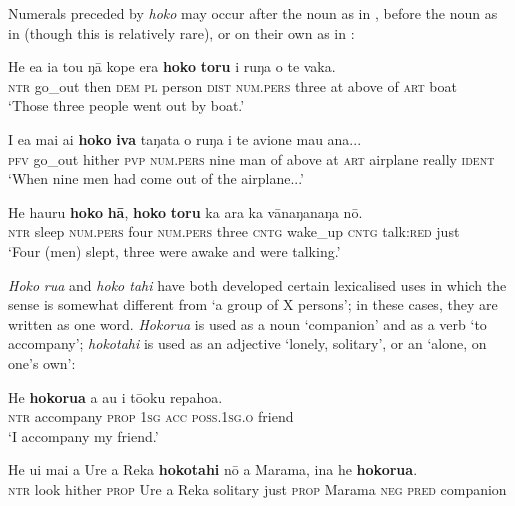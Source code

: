 Numerals preceded by \textit{hoko} may occur after the noun as in , before the noun as in  (though this is relatively rare), or on their own as in :

\ea\label{ex:4.30}
\gll He e{\ꞌ}a ia tou ŋā kope era \textbf{hoko} \textbf{toru} {\ꞌ}i ruŋa o te vaka. \\
\textsc{ntr} go\_out then \textsc{dem} \textsc{pl} person \textsc{dist} \textsc{num.pers} three at above of \textsc{art} boat \\

\glt 
‘Those three people went out by boat.’ \textstyleExampleref{[R309.102]} 
\z

\ea\label{ex:4.31}
\gll I e{\ꞌ}a mai ai \textbf{hoko} \textbf{iva} taŋata o ruŋa i te {\ꞌ}avione mau {\ꞌ}ana... \\
\textsc{pfv} go\_out hither \textsc{pvp} \textsc{num.pers} nine man of above at \textsc{art} airplane really \textsc{ident} \\

\glt 
‘When nine men had come out of the airplane...’ \textstyleExampleref{[R539-2.215]}
\z

\ea\label{ex:4.32}
\gll He ha{\ꞌ}uru \textbf{hoko} \textbf{hā}, \textbf{hoko} \textbf{toru} ka {\ꞌ}ara ka vānaŋanaŋa nō. \\
\textsc{ntr} sleep \textsc{num.pers} four \textsc{num.pers} three \textsc{cntg} wake\_up \textsc{cntg} talk:\textsc{red} just \\

\glt
‘Four (men) slept, three were awake and were talking.’ \textstyleExampleref{[MsE-050.005]}
\z

\textit{Hoko} \textit{rua} and \textit{hoko tahi} have both developed certain lexicalised uses in which the sense is somewhat different from ‘a group of X persons’; in these cases, they are written as one word. \textit{Hokorua} is used as a noun ‘companion’ and as a verb ‘to accompany’; \textit{hokotahi} is used as an adjective ‘lonely, solitary’, or an  ‘alone, on one’s own’:

\ea\label{ex:4.33}
\gll He \textbf{hokorua} a au i tō{\ꞌ}oku repahoa. \\
\textsc{ntr} accompany \textsc{prop} \textsc{1sg} \textsc{acc} \textsc{poss.1sg.o} friend \\

\glt 
‘I accompany my friend.’ \textstyleExampleref{[R208.138]} 
\z

\ea\label{ex:4.34}
\gll He u{\ꞌ}i mai a Ure {\ꞌ}a Reka \textbf{hokotahi} nō a Marama, {\ꞌ}ina he \textbf{hokorua}. \\
\textsc{ntr} look hither \textsc{prop} Ure a Reka solitary just \textsc{prop} Marama \textsc{neg} \textsc{pred} companion \\

